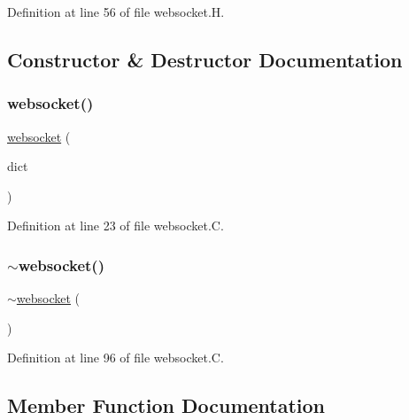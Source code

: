 Definition at line 56 of file websocket.\+H.



\subsection{Constructor \& Destructor Documentation}
\mbox{\label{classFoam_1_1websocket_a300c1219f3357ba1acd65bdd2dbd792c}} 
\subsubsection{\texorpdfstring{websocket()}{websocket()}}
{\footnotesize\ttfamily \hyperlink{classFoam_1_1websocket}{websocket} (\begin{DoxyParamCaption}\item[{const dictionary \&}]{dict }\end{DoxyParamCaption})}



Definition at line 23 of file websocket.\+C.

\mbox{\label{classFoam_1_1websocket_a0307b233f5ff01457053379be1168f43}} 
\subsubsection{\texorpdfstring{$\sim$websocket()}{~websocket()}}
{\footnotesize\ttfamily $\sim$\hyperlink{classFoam_1_1websocket}{websocket} (\begin{DoxyParamCaption}{ }\end{DoxyParamCaption})}



Definition at line 96 of file websocket.\+C.



\subsection{Member Function Documentation}
\mbox{\label{classFoam_1_1websocket_a29e24ced6840a64969bd5ba83687b121}} 
